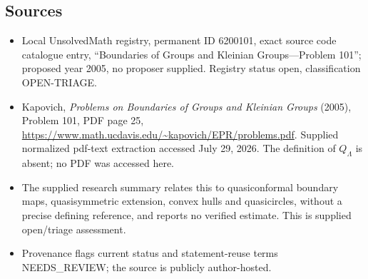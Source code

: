 \documentclass[11pt]{article}
\begin{document}
\subsection{Sources}
\begin{itemize}
\item Local UnsolvedMath registry, permanent ID 6200101, exact source code catalogue entry, ``Boundaries of Groups and Kleinian Groups---Problem 101''; proposed year 2005, no proposer supplied. Registry status open, classification OPEN-TRIAGE.
\item Kapovich, \emph{Problems on Boundaries of Groups and Kleinian Groups} (2005), Problem 101, PDF page 25, \url{https://www.math.ucdavis.edu/~kapovich/EPR/problems.pdf}. Supplied normalized pdf-text extraction accessed July 29, 2026. The definition of $Q_\Lambda$ is absent; no PDF was accessed here.
\item The supplied research summary relates this to quasiconformal boundary maps, quasisymmetric extension, convex hulls and quasicircles, without a precise defining reference, and reports no verified estimate. This is supplied open/triage assessment.
\item Provenance flags current status and statement-reuse terms NEEDS\_REVIEW; the source is publicly author-hosted.
\end{itemize}
\end{document}
